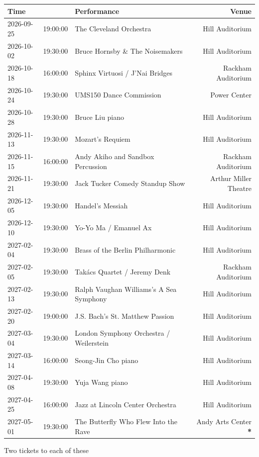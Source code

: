 \documentclass{article}
\begin{document}
\thispagestyle{empty}

\begin{tabular}{ll|l|r}
  \toprule
  \textbf{Time} & & \textbf{Performance} & \textbf{Venue} \\
  \midrule
  2026-09-25 & 19:00:00 & The Cleveland Orchestra                 & Hill Auditorium\\
  2026-10-02 & 19:30:00 & Bruce Hornsby \& The Noisemakers        & Hill Auditorium\\
  2026-10-18 & 16:00:00 & Sphinx Virtuosi / J'Nai Bridges         & Rackham Auditorium\\
  2026-10-24 & 19:30:00 & UMS150 Dance Commission                 & Power Center\\
  2026-10-28 & 19:30:00 & Bruce Liu piano                         & Hill Auditorium\\
  2026-11-13 & 19:30:00 & Mozart's Requiem                        & Hill Auditorium\\
  2026-11-15 & 16:00:00 & Andy Akiho and Sandbox Percussion       & Rackham Auditorium\\
  2026-11-21 & 19:30:00 & Jack Tucker Comedy Standup Show         & Arthur Miller Theatre\\
  2026-12-05 & 19:30:00 & Handel's Messiah                        & Hill Auditorium\\
  2026-12-10 & 19:30:00 & Yo-Yo Ma / Emanuel Ax                   & Hill Auditorium\\
  2027-02-04 & 19:30:00 & Brass of the Berlin Philharmonic        & Hill Auditorium\\
  2027-02-05 & 19:30:00 & Takács Quartet / Jeremy Denk            & Rackham Auditorium\\
  2027-02-13 & 19:30:00 & Ralph Vaughan Williams’s A Sea Symphony & Hill Auditorium\\
  2027-02-20 & 19:00:00 & J.S. Bach's St. Matthew Passion         & Hill Auditorium\\
  2027-03-04 & 19:30:00 & London Symphony Orchestra / Weilerstein & Hill Auditorium\\
  2027-03-14 & 16:00:00 & Seong-Jin Cho piano                     & Hill Auditorium\\
  2027-04-08 & 19:30:00 & Yuja Wang piano                         & Hill Auditorium\\
  2027-04-25 & 16:00:00 & Jazz at Lincoln Center Orchestra        & Hill Auditorium\\
  2027-05-01 & 19:30:00 & The Butterfly Who Flew Into the Rave    & Andy Arts Center \textbf{*} \\
  \bottomrule
\end{tabular}

Two tickets to each of these
\end{document}

